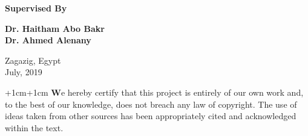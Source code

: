 \documentclass[11pt,a4paper,oneside]{bth}
\begin{document}
{\begin{center}
\par\vspace {2cm}

{\Large\textbf{Supervised By}}

\par\vspace {0.5cm}

{\Large\textbf{Dr. Haitham Abo Bakr}}\\
{\Large\textbf{Dr. Ahmed Alenany}}\\


\par\vspace {2cm}

\end{center}

\noindent%
{\large Zagazig, Egypt \\
July, 2019}

\clearpage
}


\setcounter{page}{1}


\declaration
\thispagestyle{empty}
\begin{changemargin}{+1cm}{+1cm}
\noindent
\textbf We hereby certify that this project is entirely of our own 
work and, to the best of our knowledge, does not breach any law of 
copyright. The use of ideas taken from other sources has been 
appropriately cited and acknowledged within the text.



\end{changemargin}

\end{document}
